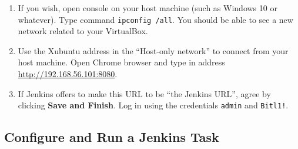\documentclass[11pt,a4paper]{article}
\begin{document}
\begin{enumerate}
\item If you wish, open console on your host machine (such as Windows 10 or whatever). Type command
{\tt ipconfig /all}. You should be able to see a new network related to your VirtualBox.\\
\item Use the Xubuntu address in the ``Host-only network'' to connect from your host machine. 
Open Chrome browser and type in address \url{http://192.168.56.101:8080}. \\
\item If Jenkins offers to make this URL to be ``the Jenkins URL'', agree by 
clicking {\bf Save and Finish}. Log in using the credentials {\tt admin} 
and {\tt Bitl1!}.
\end{enumerate}

\subsection{Configure and Run a Jenkins Task}
\end{document}
